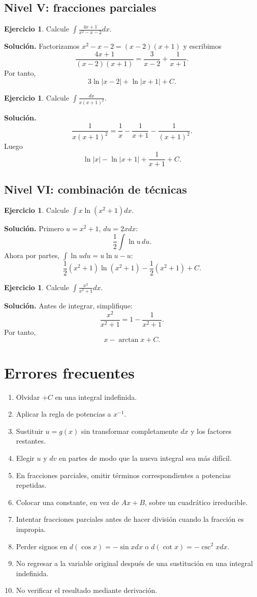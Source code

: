 \documentclass[12pt]{article}
\theoremstyle{definition}\newtheorem{definicion}[teorema]{Definición}\newtheorem{ejemplo}[teorema]{Ejemplo}\newtheorem{ejercicio}[teorema]{Ejercicio}
\theoremstyle{remark}\newtheorem*{observacion}{Observación}\newtheorem*{advertencia}{Advertencia}\newtheorem*{estrategia}{Estrategia}
\begin{document}
\subsection{Nivel V: fracciones parciales}
\begin{ejercicio}Calcule $\int\frac{4x+1}{x^2-x-2}dx$.\end{ejercicio}
\textbf{Solución.} Factorizamos $x^2-x-2=(x-2)(x+1)$ y escribimos
\[\frac{4x+1}{(x-2)(x+1)}=\frac{3}{x-2}+\frac1{x+1}.\]
Por tanto,
\[\boxed{3\ln|x-2|+\ln|x+1|+C}.\]
\begin{ejercicio}Calcule $\int\frac{dx}{x(x+1)^2}$.\end{ejercicio}
\textbf{Solución.}
\[\frac1{x(x+1)^2}=\frac1x-\frac1{x+1}-\frac1{(x+1)^2}.\]
Luego
\[\boxed{\ln|x|-\ln|x+1|+\frac1{x+1}+C}.\]

\subsection{Nivel VI: combinación de técnicas}
\begin{ejercicio}Calcule $\int x\ln(x^2+1)dx$.\end{ejercicio}
\textbf{Solución.} Primero $u=x^2+1$, $du=2xdx$:
\[\frac12\int\ln u\,du.\]
Ahora por partes, $\int\ln udu=u\ln u-u$:
\[\boxed{\frac12(x^2+1)\ln(x^2+1)-\frac12(x^2+1)+C}.\]
\begin{ejercicio}Calcule $\int\frac{x^2}{x^2+1}dx$.\end{ejercicio}
\textbf{Solución.} Antes de integrar, simplifique:
\[\frac{x^2}{x^2+1}=1-\frac1{x^2+1}.\]
Por tanto,
\[\boxed{x-\arctan x+C}.\]

\section{Errores frecuentes}
\begin{enumerate}
\item Olvidar $+C$ en una integral indefinida.
\item Aplicar la regla de potencias a $x^{-1}$.
\item Sustituir $u=g(x)$ sin transformar completamente $dx$ y los factores restantes.
\item Elegir $u$ y $dv$ en partes de modo que la nueva integral sea más difícil.
\item En fracciones parciales, omitir términos correspondientes a potencias repetidas.
\item Colocar una constante, en vez de $Ax+B$, sobre un cuadrático irreducible.
\item Intentar fracciones parciales antes de hacer división cuando la fracción es impropia.
\item Perder signos en $d(\cos x)=-\sin xdx$ o $d(\cot x)=-\csc^2xdx$.
\item No regresar a la variable original después de una sustitución en una integral indefinida.
\item No verificar el resultado mediante derivación.
\end{enumerate}
\end{document}
